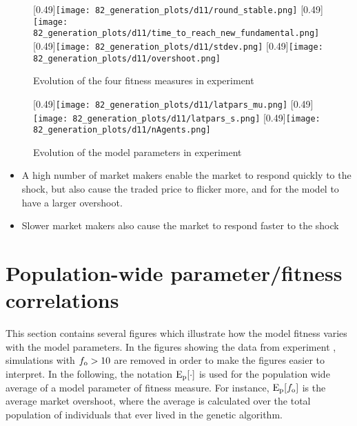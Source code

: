 \begin{figure}
	\centering
	[0.49\linewidth]{\texttt{[image: 82\_generation\_plots/d11/round\_stable.png]}}
	[0.49\linewidth]{\texttt{[image: 82\_generation\_plots/d11/time\_to\_reach\_new\_fundamental.png]}}
	\vspace{0.5cm}
	[0.49\linewidth]{\texttt{[image: 82\_generation\_plots/d11/stdev.png]}}
	[0.49\linewidth]{\texttt{[image: 82\_generation\_plots/d11/overshoot.png]}}
	\caption{Evolution of the four fitness measures in experiment \deleven}
	\label{fig:d11_evolution_fitness}
\end{figure}


\begin{figure}
	\centering
	[0.49\linewidth]{\texttt{[image: 82\_generation\_plots/d11/latpars\_mu.png]}}
	[0.49\linewidth]{\texttt{[image: 82\_generation\_plots/d11/latpars\_s.png]}}
	\vspace{0.5cm}
	[0.49\linewidth]{\texttt{[image: 82\_generation\_plots/d11/nAgents.png]}}
	\caption{Evolution of the model parameters in experiment \deleven}
	\label{fig:d11_evolution_parameters}
\end{figure}


\begin{itemize}
\item A high number of market makers enable the market to respond quickly to the shock, but also cause the traded price to flicker more, and for the model to have a larger overshoot.
\item Slower market makers also cause the market to respond faster to the shock
\end{itemize}


\section{Population-wide parameter/fitness correlations}
This section contains several figures which illustrate how the model fitness varies with the model parameters. In the figures showing the data from experiment \deleven, simulations with $f_\text{o}>10$ are removed in order to make the figures easier to interpret. In the following, the notation $\mathrm{E}_\text{p}[\cdot]$ is used for the population wide average of a model parameter of fitness measure. For instance, $\mathrm{E}_\text{p}[f_\text{o}]$ is the average market overshoot, where the average is calculated over the total population of individuals that ever lived in the genetic algorithm.


